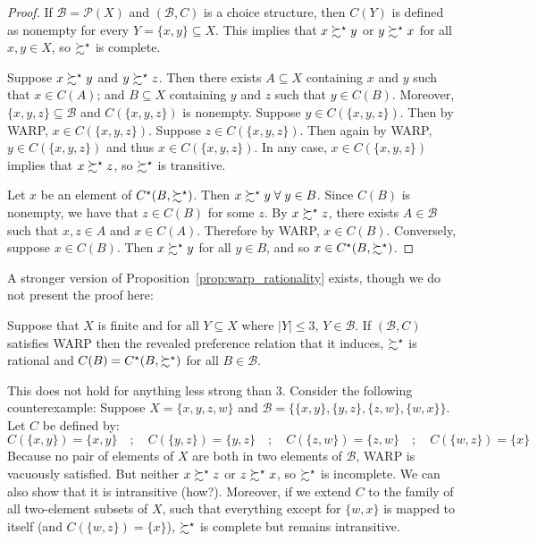 \documentclass[12pt]{article}
\begin{document}
\begin{proof}
	If $\mathcal{B} = \mathcal{P}(X)$ and $(\mathcal{B},C)$ is a choice structure, then $C(Y)$ is defined as nonempty for every $Y = \{x,y\} \subseteq X$. This implies that $x \succsim^\star y$ or $y \succsim^\star x$ for all $x,y \in X$, so $\succsim^\star$ is complete.
	
	Suppose $x\succsim^\star y$ and $y \succsim^\star z$. Then there exists $A \subseteq X$ containing $x$ and $y$ such that $x \in C(A)$; and $B\subseteq X$ containing $y$ and $z$ such that $y \in C(B)$. Moreover, $\{x,y,z\} \subseteq \mathcal{B}$ and $C(\{x,y,z\})$ is nonempty. Suppose $y \in C(\{x,y,z\})$. Then by WARP, $x \in C(\{x,y,z\})$. Suppose $z \in C(\{x,y,z\})$. Then again by WARP, $y \in C(\{x,y,z\})$ and thus $x \in C(\{x,y,z\})$. In any case, $x \in C(\{x,y,z\})$ implies that $x \succsim^\star z$, so $\succsim^\star$ is transitive.
	
	Let $x$ be an element of $C^\star(B,\succsim^\star)$. Then $x \succsim\opt y \forall y \in B$. Since $C(B)$ is nonempty, we have that $z \in C(B)$ for some $z$. By $x \succsim^\star z$, there exists $A \in \mathcal{B}$ such that $x,z \in A$ and $x \in C(A)$. Therefore by WARP, $x \in C(B)$. Conversely, suppose $x \in C(B)$. Then $x \succsim^\star y$ for all $y \in B$, and so $x \in C^\star(B,\succsim^\star)$.
\end{proof}

\begin{remark}
	A stronger version of Proposition~\ref{prop:warp_rationality} exists, though we do not present the proof here:
\end{remark}
\begin{proposition}\label{prop:warp_rationality_3}
	Suppose that $X$ is finite and for all $Y \subseteq X$ where $|Y| \le 3$, $Y \in \mathcal{B}$. If $(\mathcal{B},C)$ satisfies WARP then the revealed preference relation that it induces, $\succsim^\star$ is rational and $C(B) = C^\star(B,\succsim^\star)$ for all $B \in \mathcal{B}$.
\end{proposition}

\begin{remark}
	This does not hold for anything less strong than 3. Consider the following counterexample: Suppose $X = \{x,y,z,w\}$ and $\mathcal{B} = \{\{x,y\},\{y,z\},\{z,w\},\{w,x\}\}$. Let $C$ be defined by:
	\[
	C(\{x,y\}) = \{x,y\} \quad ;\quad C(\{y,z\}) = \{y,z\} \quad ;\quad C(\{z,w\}) = \{z,w\} \quad ;\quad C(\{w,z\}) = \{x\} 
	\]
	Because no pair of elements of $X$ are both in two elements of $\mathcal{B}$, WARP is vacuously satisfied. But neither $x \succsim^\star z$ or $z \succsim^\star x$, so $\succsim^\star$ is incomplete. We can also show that it is intransitive (how?). Moreover, if we extend $C$ to the family of all two-element subsets of $X$, such that everything except for $\{w,x\}$ is mapped to itself (and $C(\{w,z\}) = \{x\}$), $\succsim^\star$ is complete but remains intransitive.
\end{remark}
\end{document}
